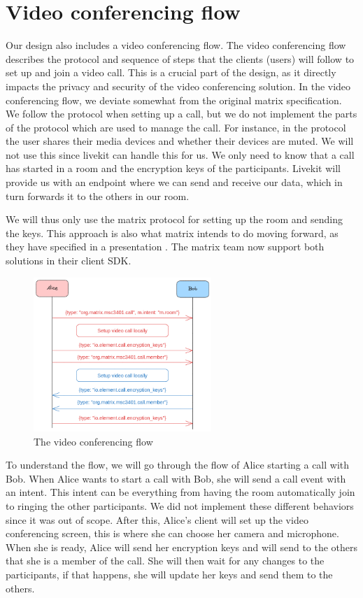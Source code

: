 \documentclass{report}
\begin{document}
\section{Video conferencing flow}
Our design also includes a video conferencing flow. The video conferencing flow describes the protocol and sequence
of steps that the clients (users) will follow to set up and join a video call.
This is a crucial part of the design, as it directly impacts the privacy and security of the video conferencing solution.
In the video conferencing flow, we deviate somewhat from the original matrix specification. We follow the protocol
when setting up a call, but we do not implement the parts of the protocol which are used to manage the call. For
instance, in the protocol the user shares their media devices and whether their devices are muted. We will not use
this since livekit can handle this for us. We only need to know that a call has started in a room and the encryption
keys of the participants. Livekit will provide us with an endpoint where we can send and receive our data, which in
turn forwards it to the others in our room.

We will thus only use the matrix protocol for setting up the room and sending the keys. This approach is also what
matrix intends to do moving forward, as they have specified in a presentation \cite{nirve_matrixrtc_nodate}. The
matrix team now support both solutions in their client SDK.

\begin{figure}
\centering
\includegraphics[width=0.6\textwidth]{img/Callflow.excalidraw.png}
\caption{The video conferencing flow}
\label{fig:video-conference-flow}
\end{figure}

To understand the flow, we will go through the flow of Alice starting a call with Bob.
When Alice wants to start a call with Bob, she will send a call event with an intent. This intent can be
everything from having the room automatically join to ringing the other participants. We did not implement
these different behaviors since it was out of scope. After this, Alice's client will set up the video conferencing
screen, this is where she can choose her camera and microphone. When she is ready, Alice will send her encryption
keys and will send to the others that she is a member of the call. She will then wait for any changes to the
participants, if that happens, she will update her keys and send them to the others.
\end{document}
